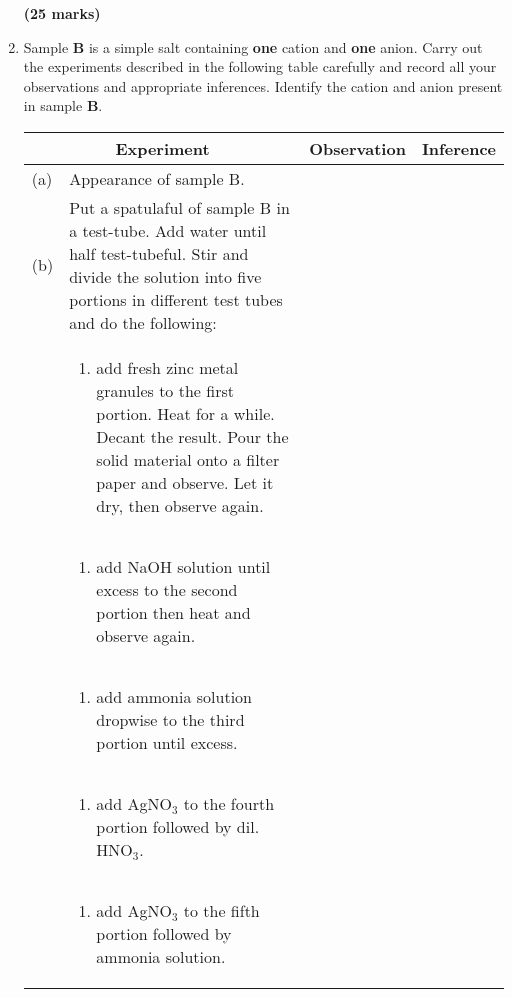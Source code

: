 \begin{enumerate}
\raggedleft \textbf{(25 marks)}\newpage

\raggedright

\item[2.] Sample \textbf{B} is a simple salt containing \textbf{one} cation and \textbf{one} anion. Carry out the experiments described in the following table carefully and record all your observations and appropriate inferences. Identify the cation and anion present in sample \textbf{B}.\\

\begin{center}
\begin{tabular}{|l|p{8cm}|l|l|}
\hline
\multicolumn{2}{|c|}{\textbf{Experiment}}&\textbf{Observation}&\textbf{Inference}\\ \hline
(a)&Appearance of sample B.&&\\ \hline
(b)&Put a spatulaful of sample B in a test-tube. Add water until half test-tubeful. Stir and divide the solution into five portions in different test tubes and do the following:&&\\ \cline{2-4}
&\begin{enumerate}
\item[(i)] add fresh zinc metal granules to the first portion. Heat for a while. Decant the result. Pour the solid material onto a filter paper and observe. Let it dry, then observe again.
\end{enumerate}&&\\ \cline{2-4}
&\begin{enumerate}
\item[(ii)] add NaOH solution until excess to the second portion then heat and observe again.
\end{enumerate}&&\\ \cline{2-4}
&\begin{enumerate}
\item[(iii)] add ammonia solution dropwise to the third portion until excess.
\end{enumerate}&&\\ \cline{2-4}
&\begin{enumerate}
\item[(iv)] add AgNO$_3$ to the fourth portion followed by dil. HNO$_3$.
\end{enumerate}&&\\ \cline{2-4}
&\begin{enumerate}
\item[(v)] add AgNO$_3$ to the fifth portion followed by ammonia solution.
\end{enumerate}&&\\ \hline
\end{tabular}\\


\end{center}
\end{enumerate}
